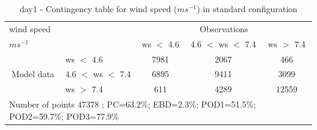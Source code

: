 \begin{table}[h!]
\begin{center}
\begin{tabular}{llccc}
\hline
{wind speed}                                       &                                                    & \multicolumn{3}{c}{Observations}                 \\
{$m s^{-1}$}                                       &                             & ws $<$ 4.6   & 4.6 $<$ ws $<$ 7.4 & ws $>$ 7.4 \\
\hline
\multicolumn{1}{c}{\multirow{3}{*}{Model data}}  & ws $<$ 4.6             & 7981                & 2067                       & 466              \\
                                                 & 4.6  $<$ ws $<$ 7.4 & 6895                & 9411                       & 3099              \\
                                                 & ws $>$ 7.4             & 611                & 4289                       & 12559              \\
\hline 
\multicolumn{5}{l}{ Number of points        47378 ; PC=63.2\%; EBD=2.3\%; POD1=51.5\%; POD2=59.7\%; POD3=77.9\%}                 \\
\end{tabular}
\end{center}
\caption{day1 - Contingency table for {wind speed} ($m s^{-1}$) in standard configuration}
\label{tab:contingencywsBEF:day1}
\end{table}
